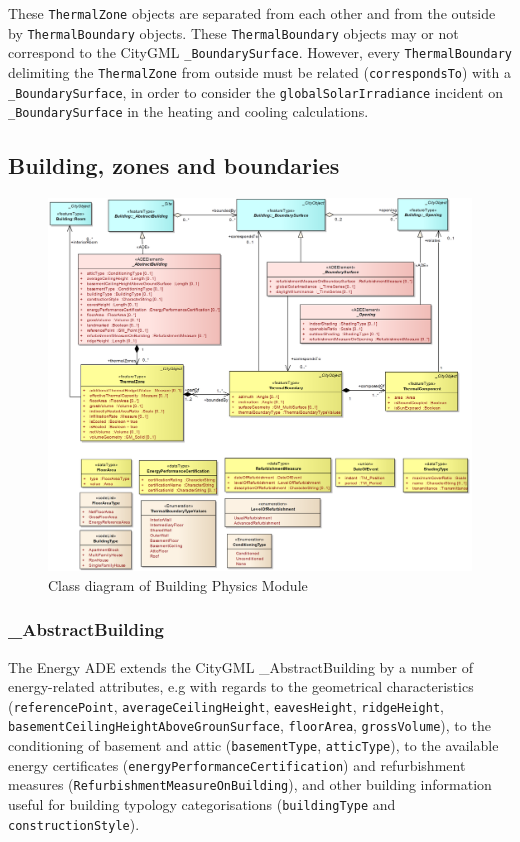 \documentclass[a4paper,12pt]{article}
\begin{document}
These \texttt{ThermalZone} objects are separated from each other and
from the outside by \texttt{ThermalBoundary} objects. These
\texttt{ThermalBoundary} objects may or not correspond to the CityGML
\texttt{\_BoundarySurface}. However, every \texttt{ThermalBoundary}
delimiting the \texttt{ThermalZone} from outside must be related
(\texttt{correspondsTo}) with a \texttt{\_BoundarySurface}, in order to
consider the \texttt{globalSolarIrradiance} incident on
\texttt{\_BoundarySurface} in the heating and cooling calculations.

\subsection{Building, zones and
boundaries}\label{building-zones-and-boundaries}

\begin{figure}[htbp]
\centering
\includegraphics{fig/class_geometry.png}
\caption{Class diagram of Building Physics Module}
\end{figure}

\subsubsection{\_AbstractBuilding}\label{abstractbuilding}

The Energy ADE extends the CityGML \_AbstractBuilding by a number of
energy-related attributes, e.g with regards to the geometrical
characteristics (\texttt{referencePoint}, \texttt{averageCeilingHeight},
\texttt{eavesHeight}, \texttt{ridgeHeight},
\texttt{basementCeilingHeightAboveGrounSurface}, \texttt{floorArea},
\texttt{grossVolume}), to the conditioning of basement and attic
(\texttt{basementType}, \texttt{atticType}), to the available energy
certificates (\texttt{energyPerformanceCertification}) and refurbishment
measures (\texttt{RefurbishmentMeasureOnBuilding}), and other building
information useful for building typology categorisations
(\texttt{buildingType} and \texttt{constructionStyle}).
\end{document}
